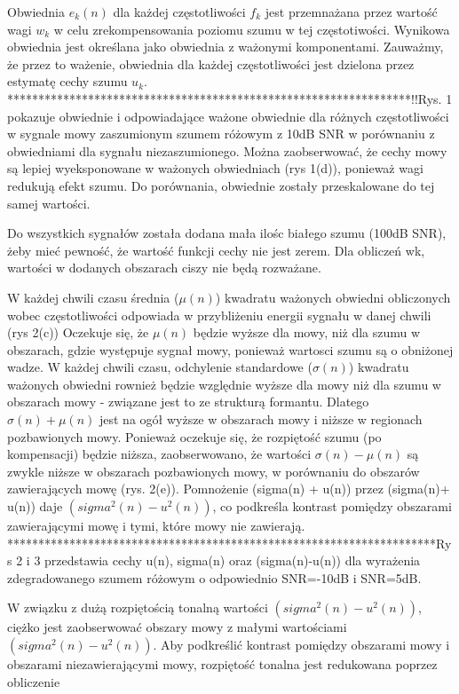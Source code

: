 \documentclass[eng,printmode]{mgr}
\begin{document}
  Obwiednia $e_{k}(n)$ dla każdej częstotliwości $f_{k}$ jest przemnażana przez wartość wagi $w_{k}$ w celu zrekompensowania poziomu szumu w tej częstotiwości. Wynikowa obwiednia jest określana jako obwiednia z ważonymi komponentami. Zauważmy, że przez to ważenie, obwiednia dla każdej częstotliwości jest dzielona przez estymatę cechy szumu $u_{k}$. 
  *****************************************************************!!Rys. 1 pokazuje obwiednie i odpowiadające ważone obwiednie dla różnych częstotliwości w sygnale mowy  zaszumionym szumem różowym z 10dB SNR w porównaniu z obwiedniami dla sygnału niezaszumionego. Można zaobserwować, że cechy mowy są lepiej wyeksponowane w ważonych obwiedniach (rys 1(d)), ponieważ wagi redukują efekt szumu. Do porównania, obwiednie zostały przeskalowane do tej samej wartości. 
  
  Do wszystkich sygnałów została dodana mała ilośc białego szumu (100dB SNR), żeby mieć pewność, że wartość funkcji cechy nie jest zerem. Dla obliczeń wk, wartości w dodanych obszarach ciszy nie będą rozważane. 
  
  W każdej chwili czasu średnia ($\mu(n)$) kwadratu ważonych obwiedni obliczonych  wobec częstotliwości odpowiada w przybliżeniu energii sygnału w danej chwili (rys 2(c)) Oczekuje się, że $\mu(n)$ będzie wyższe dla mowy, niż dla szumu w obszarach, gdzie występuje sygnał mowy, ponieważ wartosci szumu są o obniżonej wadze. W każdej chwili czasu, odchylenie standardowe ($\sigma(n)$) kwadratu ważonych obwiedni rownież będzie względnie wyższe dla mowy niż dla szumu w obszarach mowy - związane jest to ze strukturą formantu. Dlatego $\sigma(n)+ \mu(n)$ jest na ogół wyższe w obszarach mowy i niższe w regionach pozbawionych mowy. Ponieważ oczekuje się, że rozpiętość szumu (po kompensacji) będzie niższa, zaobserwowano, że wartości $\sigma(n)-\mu(n)$ są zwykle niższe w obszarach pozbawionych mowy, w porównaniu do obszarów zawierających mowę (rys. 2(e)). Pomnożenie (sigma(n) + u(n)) przez (sigma(n)+ u(n)) daje $(sigma^2(n) - u^2(n))$, co podkreśla kontrast pomiędzy obszarami zawierającymi mowę i tymi, które mowy nie zawierają. *********************************************************************Rys 2 i 3 przedstawia cechy u(n), sigma(n) oraz (sigma(n)-u(n)) dla wyrażenia zdegradowanego szumem różowym o odpowiednio SNR=-10dB i SNR=5dB.   
  
  W związku z dużą rozpiętością tonalną wartości $(sigma^2(n) - u^2(n))$, ciężko jest zaobserwować obszary mowy z małymi wartościami  $(sigma^2(n) - u^2(n))$. Aby podkreślić kontrast pomiędzy obszarami mowy i obszarami niezawierającymi mowy, rozpiętość tonalna jest redukowana poprzez obliczenie
  
\end{document}
